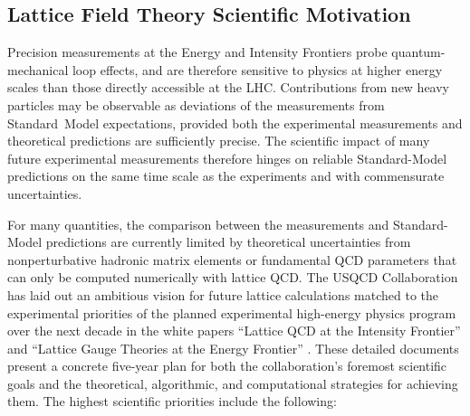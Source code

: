 \subsection{Lattice Field Theory Scientific Motivation}

Precision measurements at the Energy and Intensity Frontiers probe
quantum-mechanical loop effects, and are therefore sensitive to physics at
higher energy scales than those directly accessible at the LHC.  Contributions
from new heavy particles may be observable as deviations of the measurements
from Standard~Model expectations, provided both the experimental measurements
and theoretical predictions are sufficiently precise.  The scientific impact
of many future experimental measurements therefore hinges on reliable
Standard-Model predictions on the same time scale as the experiments and with
commensurate uncertainties.

For many quantities, the comparison between the measurements and
Standard-Model predictions are currently limited by theoretical uncertainties
from nonperturbative hadronic matrix elements or fundamental QCD parameters
that can only be computed numerically with lattice QCD.  The USQCD
Collaboration has laid out an ambitious vision for future lattice calculations
matched to the experimental priorities of the planned experimental high-energy
physics program over the next decade in the white papers ``Lattice QCD at the
Intensity Frontier'' and ``Lattice Gauge Theories at the Energy Frontier''
\cite{USQCD_IF_whitepaper13,USQCD_EF_whitepaper13}.  These detailed documents
present a concrete five-year plan for both the collaboration's foremost
scientific goals and the theoretical, algorithmic, and computational
strategies for achieving them.  The highest scientific priorities include
the following:

